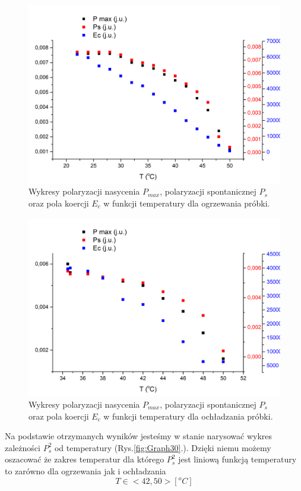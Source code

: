 \documentclass{article}
\begin{document}
\begin{figure}[!h]
	\centering
	\includegraphics[width=0.8\linewidth]{Graph28.png}
	\caption{Wykresy polaryzacji nasycenia $P_{max}$, polaryzacji spontanicznej $P_{s}$ oraz pola koercji $E_{c}$ w funkcji temperatury dla ogrzewania próbki.}
	\label{fig:Graph28}
\end{figure}
\begin{figure}[!h]
	\centering
	\includegraphics[width=0.8\linewidth]{Graph29.png}
	\caption{Wykresy polaryzacji nasycenia $P_{max}$, polaryzacji spontanicznej $P_{s}$ oraz pola koercji $E_{c}$ w funkcji temperatury dla ochładzania próbki.}
	\label{fig:Graph29}
\end{figure}

Na podstawie otrzymanych wyników jesteśmy w stanie narysować wykres zależności $P_{s}^{2}$ od temperatury (Rys.\ref{fig:Graph30}.). Dzięki niemu możemy oszacować że zakres temperatur dla którego $P_{s}^{2}$ jest liniową funkcją temperatury to zarówno dla ogrzewania jak i ochładzania 
\begin{equation}
T\in <42 , 50 > [^{o}C]
\end{equation}
\end{document}
